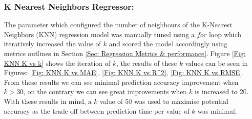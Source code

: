 \subsubsection{K Nearest Neighbors Regressor:} \label{Sec: KNN tuning}
The parameter which configured the number of neighbours of the K-Nearest Neighbors (KNN) regression model was manually tuned using a $for$ loop which iteratively increased the value of $k$ and scored the model accordingly using metrics outlines in Section \ref{Sec: Regression Metrics & performance}. Figure \ref{Fig: KNN K vs k} shows the iteration of $k$, the results of these $k$ values can be seen in Figures: \ref{Fig: KNN K vs MAE}, \ref{Fig: KNN K vs R^2}, \ref{Fig: KNN K vs RMSE}. From these results we can see minimal prediction accuracy improvement when $k > 30$, on the contrary we can see great improvements when $k$ is increased to 20. With these results in mind, a $k$ value of 50 was used to maximise potential accuracy as the trade off between prediction time per value of $k$ was minimal.


